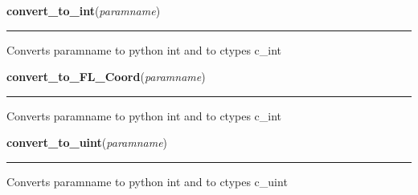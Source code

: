     \label{xformslib:library:convert_to_int}

    \vspace{0.5ex}

\hspace{.8\funcindent}\begin{boxedminipage}{\funcwidth}

    \raggedright \textbf{convert\_to\_int}(\textit{paramname})

    \vspace{-1.5ex}

    \rule{\textwidth}{0.5\fboxrule}
\setlength{\parskip}{2ex}
    Converts paramname to python int and to ctypes c\_int

\setlength{\parskip}{1ex}
    \end{boxedminipage}

    \label{xformslib:library:convert_to_int}

    \vspace{0.5ex}

\hspace{.8\funcindent}\begin{boxedminipage}{\funcwidth}

    \raggedright \textbf{convert\_to\_FL\_Coord}(\textit{paramname})

    \vspace{-1.5ex}

    \rule{\textwidth}{0.5\fboxrule}
\setlength{\parskip}{2ex}
    Converts paramname to python int and to ctypes c\_int

\setlength{\parskip}{1ex}
    \end{boxedminipage}

    \label{xformslib:library:convert_to_uint}

    \vspace{0.5ex}

\hspace{.8\funcindent}\begin{boxedminipage}{\funcwidth}

    \raggedright \textbf{convert\_to\_uint}(\textit{paramname})

    \vspace{-1.5ex}

    \rule{\textwidth}{0.5\fboxrule}
\setlength{\parskip}{2ex}
    Converts paramname to python int and to ctypes c\_uint

\setlength{\parskip}{1ex}
    \end{boxedminipage}

